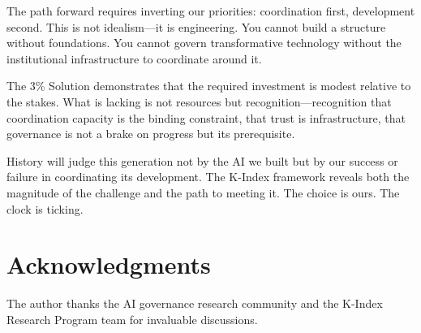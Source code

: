 \documentclass[11pt,letterpaper]{article}
\begin{document}
The path forward requires inverting our priorities: coordination first, development second. This is not idealism---it is engineering. You cannot build a structure without foundations. You cannot govern transformative technology without the institutional infrastructure to coordinate around it.

The 3\% Solution demonstrates that the required investment is modest relative to the stakes. What is lacking is not resources but recognition---recognition that coordination capacity is the binding constraint, that trust is infrastructure, that governance is not a brake on progress but its prerequisite.

History will judge this generation not by the AI we built but by our success or failure in coordinating its development. The K-Index framework reveals both the magnitude of the challenge and the path to meeting it. The choice is ours. The clock is ticking.

\section*{Acknowledgments}

The author thanks the AI governance research community and the K-Index Research Program team for invaluable discussions.



\end{document}
